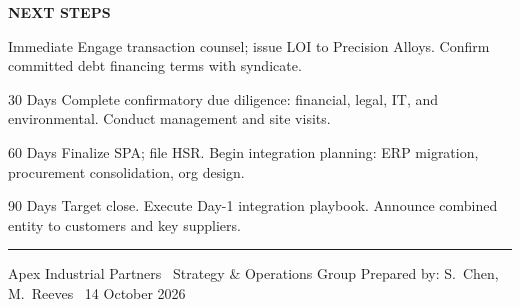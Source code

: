 \documentclass[10pt,letterpaper]{article}
\newcommand{\sectiontitle}[1]{%
  \vspace{2pt}%
  {\color{navy}\bfseries\footnotesize\MakeUppercase{#1}}%
  \vspace{2pt}%
}
\begin{document}
\vspace{10pt}

\sectiontitle{Next Steps}

\vspace{4pt}
\begin{tcbraster}[raster columns=4, raster equal height,
                  raster column skip=5pt, raster force size=false]
\begin{stepbox}{}{Immediate}
  Engage transaction counsel; issue LOI to Precision Alloys. Confirm
  committed debt financing terms with syndicate.
\end{stepbox}
\begin{stepbox}{}{30 Days}
  Complete confirmatory due diligence: financial, legal, IT, and
  environmental. Conduct management and site visits.
\end{stepbox}
\begin{stepbox}{}{60 Days}
  Finalize SPA; file HSR. Begin integration planning: ERP migration,
  procurement consolidation, org design.
\end{stepbox}
\begin{stepbox}{}{90 Days}
  Target close. Execute Day-1 integration playbook. Announce combined
  entity to customers and key suppliers.
\end{stepbox}
\end{tcbraster}

\vspace{6pt}

{\color{gold}\rule{\textwidth}{0.6pt}}
\vspace{2pt}
{\color{slate}\footnotesize Apex Industrial Partners \textbar\ Strategy \& Operations Group
 \hfill Prepared by: S.\ Chen, M.\ Reeves \textbar\ 14 October 2026}
\end{document}
